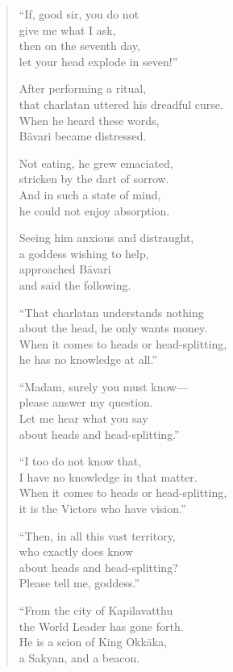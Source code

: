 \documentclass[12pt,openany]{book}%
\begin{document}
\begin{verse}
“If, good sir, you do not \\
give me what I ask, \\
then on the seventh day, \\
let your head explode in seven!” 

After performing a ritual, \\
that charlatan uttered his dreadful curse. \\
When he heard these words, \\
\textsanskrit{Bāvari} became distressed. 

Not eating, he grew emaciated, \\
stricken by the dart of sorrow. \\
And in such a state of mind, \\
he could not enjoy absorption. 

Seeing him anxious and distraught, \\
a goddess wishing to help, \\
approached \textsanskrit{Bāvari} \\
and said the following. 

“That charlatan understands nothing \\
about the head, he only wants money. \\
When it comes to heads or head-splitting, \\
he has no knowledge at all.” 

“Madam, surely you must know—\\
please answer my question. \\
Let me hear what you say \\
about heads and head-splitting.” 

“I too do not know that, \\
I have no knowledge in that matter. \\
When it comes to heads or head-splitting, \\
it is the Victors who have vision.” 

“Then, in all this vast territory, \\
who exactly does know \\
about heads and head-splitting? \\
Please tell me, goddess.” 

“From the city of Kapilavatthu \\
the World Leader has gone forth. \\
He is a scion of King \textsanskrit{Okkāka}, \\
a Sakyan, and a beacon. 


\end{verse}
\end{document}

